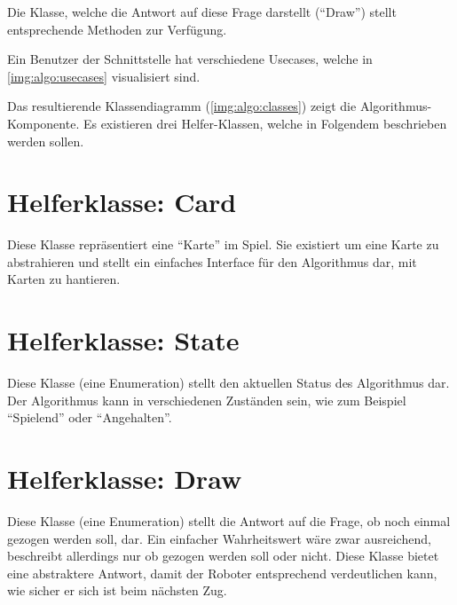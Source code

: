     Die Klasse, welche die Antwort auf diese Frage darstellt (``Draw'') stellt
    entsprechende Methoden zur Verfügung.

    Ein Benutzer der Schnittstelle hat verschiedene Usecases, welche in
    \autoref{img:algo:usecases} visualisiert sind.

    Das resultierende Klassendiagramm (\autoref{img:algo:classes}) zeigt die
    Algorithmus-Komponente.
    Es existieren drei Helfer-Klassen, welche in Folgendem beschrieben werden
    sollen.

    \section{Helferklasse: Card}

        Diese Klasse repräsentiert eine ``Karte'' im Spiel.
        Sie existiert um eine Karte zu abstrahieren und stellt ein einfaches
        Interface für den Algorithmus dar, mit Karten zu hantieren.

    \section{Helferklasse: State}

        Diese Klasse (eine Enumeration) stellt den aktuellen Status des
        Algorithmus dar.
        Der Algorithmus kann in verschiedenen Zuständen sein, wie zum Beispiel
        ``Spielend'' oder ``Angehalten''.

    \section{Helferklasse: Draw}

        Diese Klasse (eine Enumeration) stellt die Antwort auf die Frage, ob
        noch einmal gezogen werden soll, dar.
        Ein einfacher Wahrheitswert wäre zwar ausreichend, beschreibt allerdings
        nur ob gezogen werden soll oder nicht.
        Diese Klasse bietet eine abstraktere Antwort, damit der Roboter
        entsprechend verdeutlichen kann, wie sicher er sich ist beim nächsten
        Zug.

